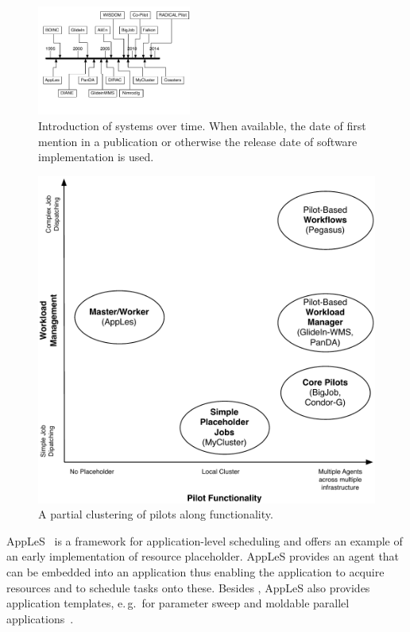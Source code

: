 \documentclass{sig-alternate}
\begin{document}

\begin{figure}[t]
  \centering
    \includegraphics[width=0.45\textwidth]{figures/timeline}
    \caption{Introduction of systems over time. When available, the date of
      first mention in a publication or otherwise the release date of software
      implementation is used.  }
    \label{fig:timeline}
\end{figure}


\begin{figure}[t]
  \centering
    \includegraphics[width=.45\textwidth]{figures/pilotjob-clustering.pdf}
    \caption{A partial clustering of pilots along functionality.  }
  \label{fig:pilotjob_clustering}
\end{figure}

AppLeS~\cite{berman1996application} is a framework for application-level
scheduling and offers an example of an early implementation of resource
placeholder. AppLeS provides an agent that can be embedded into an application
thus enabling the application to acquire resources and to schedule tasks onto
these. Besides \MW, AppLeS also provides application templates, e.\,g.\ for
parameter sweep and moldable parallel applications~\cite{berman2003adaptive}.
\end{document}
